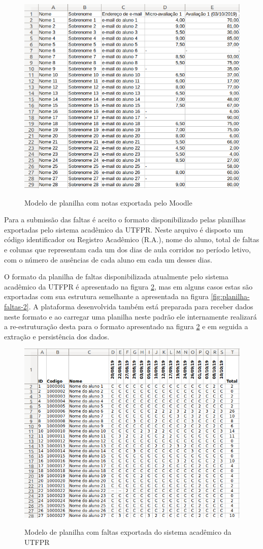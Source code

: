 \begin{figure}[!htb]
    \centering
    \caption{Modelo de planilha com notas exportada pelo Moodle}
    \includegraphics[height=0.6\textwidth]{./dados/figuras/planilha-notas-2}
    \label{fig:planilha-notas}
\end{figure}

Para a submissão das faltas é aceito o formato disponibilizado pelas planilhas exportadas pelo sistema acadêmico da UTFPR. 
Neste arquivo é disposto um código identificador ou Registro Acadêmico (R.A.), nome do aluno, total de faltas e colunas que representam cada um dos dias de aula corridos no período letivo, com o número de ausências de cada aluno em cada um desses dias.

O formato da planilha de faltas disponibilizada atualmente pelo sistema acadêmico da UTFPR é apresentado na figura \ref{fig:planilha-faltas}, mas em alguns casos estas são exportadas com sua estrutura semelhante a apresentada na figura \ref{fig:planilha-faltas-2}. 
A plataforma desenvolvida também está preparada para receber dados neste formato e ao carregar uma planilha neste padrão ele internamente realizará a re-estruturação desta para o formato apresentado na figura \ref{fig:planilha-faltas} e em seguida a extração e persistência dos dados.

\begin{figure}[!htb]
    \centering
    \caption{Modelo de planilha com faltas exportada do sistema acadêmico da UTFPR}
    \includegraphics[height=0.6\textwidth]{./dados/figuras/planilha-faltas}
    \label{fig:planilha-faltas}
\end{figure}

